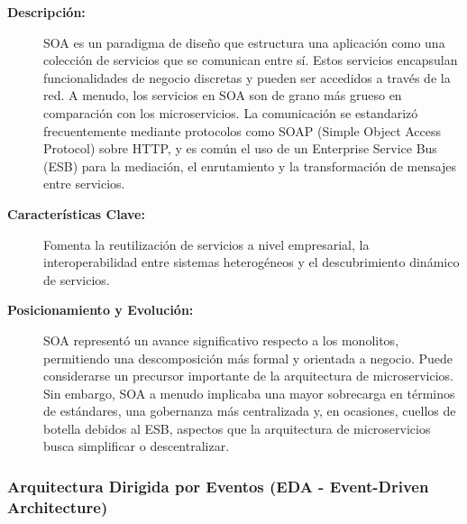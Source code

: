 \begin{description}
    \item[\textbf{Descripción:}] SOA es un paradigma de diseño que estructura una aplicación como una colección de servicios que se comunican entre sí. Estos servicios encapsulan funcionalidades de negocio discretas y pueden ser accedidos a través de la red. A menudo, los servicios en SOA son de grano más grueso en comparación con los microservicios. La comunicación se estandarizó frecuentemente mediante protocolos como SOAP (Simple Object Access Protocol) sobre HTTP, y es común el uso de un Enterprise Service Bus (ESB) para la mediación, el enrutamiento y la transformación de mensajes entre servicios.
    \item[\textbf{Características Clave:}] Fomenta la reutilización de servicios a nivel empresarial, la interoperabilidad entre sistemas heterogéneos y el descubrimiento dinámico de servicios.
    \item[\textbf{Posicionamiento y Evolución:}] SOA representó un avance significativo respecto a los monolitos, permitiendo una descomposición más formal y orientada a negocio. Puede considerarse un precursor importante de la arquitectura de microservicios. Sin embargo, SOA a menudo implicaba una mayor sobrecarga en términos de estándares, una gobernanza más centralizada y, en ocasiones, cuellos de botella debidos al ESB, aspectos que la arquitectura de microservicios busca simplificar o descentralizar.
\end{description}

\subsubsection*{Arquitectura Dirigida por Eventos (EDA - Event-Driven Architecture)}

